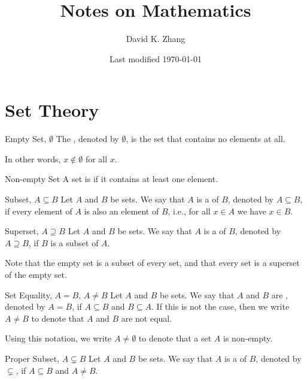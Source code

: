 \documentclass[12pt]{report}
\title{Notes on Mathematics}
\author{David K. Zhang}
\date{Last modified \today}
\begin{document}
\maketitle
{}
\listofdefinition
\clearpage
\listoftheorem
\clearpage
{}



\chapter{Set Theory}

\begin{dfnbox}{Empty Set, $\emptyset$}
	The , denoted by $\emptyset$, is the set that contains no elements at all.
\end{dfnbox}

In other words, $x \notin \emptyset$ for all $x$.

\begin{dfnbox}{Non-empty Set}
	A set is  if it contains at least one element.
\end{dfnbox}

\begin{dfnbox}{Subset, $A \subseteq B$}
	Let $A$ and $B$ be sets. We say that $A$ is a  of $B$, denoted by $A \subseteq B$, if every element of $A$ is also an element of $B$, i.e., for all $x \in A$ we have $x \in B$.
\end{dfnbox}

\begin{dfnbox}{Superset, $A \supseteq B$}
	Let $A$ and $B$ be sets. We say that $A$ is a  of $B$, denoted by $A \supseteq B$, if $B$ is a subset of $A$.
\end{dfnbox}

Note that the empty set is a subset of every set, and that every set is a superset of the empty set.

\begin{dfnbox}{Set Equality, $A = B$, $A \ne B$}
	Let $A$ and $B$ be sets. We say that $A$ and $B$ are , denoted by $A = B$, if $A \subseteq B$ and $B \subseteq A$. If this is not the case, then we write $A \ne B$ to denote that $A$ and $B$ are not equal.
\end{dfnbox}

Using this notation, we write $A \ne \emptyset$ to denote that a set $A$ is non-empty.

\begin{dfnbox}{Proper Subset, $A \subsetneq B$}
	Let $A$ and $B$ be sets. We say that $A$ is a  of $B$, denoted by $\subsetneq$, if $A \subseteq B$ and $A \ne B$.
\end{dfnbox}
\end{document}

